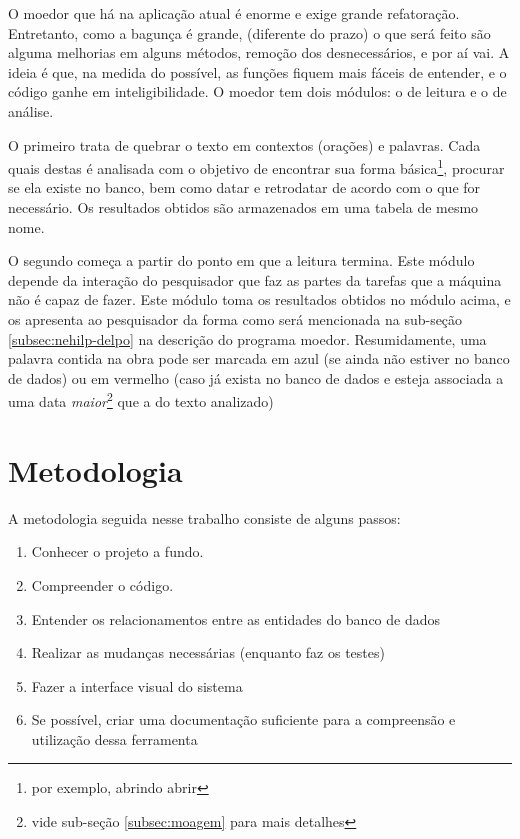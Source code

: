 O moedor que há na aplicação atual é enorme e exige grande refatoração. Entretanto, como a bagunça é grande,
(diferente do prazo) o que será feito são alguma melhorias em alguns métodos, remoção dos desnecessários, e
por aí vai. A ideia é que, na medida do possível, as funções fiquem mais fáceis de entender, e o código ganhe
em inteligibilidade. O moedor tem dois módulos: o de leitura e o de análise.

O primeiro trata de quebrar o texto em contextos (orações) e palavras. Cada quais destas é analisada com o
objetivo de encontrar sua forma básica\footnote{por exemplo, abrindo \dir abrir}, procurar se ela existe no
banco, bem como datar e retrodatar de acordo com o que for necessário. Os resultados obtidos são armazenados
em uma tabela de mesmo nome.

O segundo começa a partir do ponto em que a leitura termina. Este módulo depende da interação do pesquisador
que faz as partes da tarefas que a máquina não é capaz de fazer. Este módulo toma os resultados obtidos no
módulo acima, e os apresenta ao pesquisador da forma como será mencionada na sub-seção \ref{subsec:nehilp-delpo}
na descrição do programa moedor. Resumidamente, uma palavra contida na obra pode ser marcada em azul (se ainda
não estiver no banco de dados) ou em vermelho (caso já exista no banco de dados e esteja associada a uma data
\emph{maior}\footnote{vide sub-seção \ref{subsec:moagem} para mais detalhes} que a do texto analizado)

\section{Metodologia}
\label{sec:methodology}

A metodologia seguida nesse trabalho consiste de alguns passos:
\begin{enumerate}
    \item Conhecer o projeto a fundo.
    \item Compreender o código.
    \item Entender os relacionamentos entre as entidades do banco de dados
    \item Realizar as mudanças necessárias (enquanto faz os testes)
    \item Fazer a interface visual do sistema
    \item Se possível, criar uma documentação suficiente para a compreensão e
    utilização dessa ferramenta
\end{enumerate}

